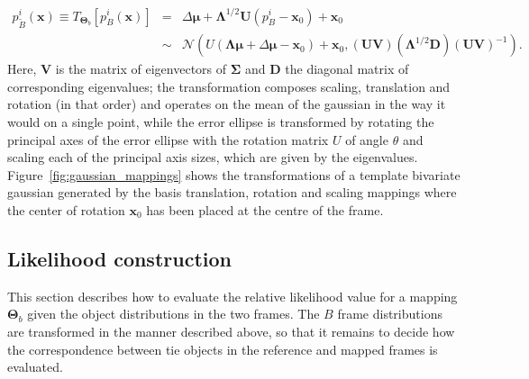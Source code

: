 \documentclass[manuscript]{aastex}
\newcommand{\N}{\mathcal{N}}
\newcommand{\bsmu}{\boldsymbol\mu}
\newcommand{\bsS}{\boldsymbol\Sigma}
\newcommand{\bsL}{\boldsymbol\Lambda}
\newcommand{\bsT}{\boldsymbol\Theta}
\begin{document}
\begin{eqnarray}
 p^i_{\tilde{B}}(\mathbf{x}) \equiv T_{\bsT_b}\left[p^i_{B}(\mathbf{x})\right]& = & \Delta\bsmu + \bsL^{1/2}\mathbf{U}(p^i_B-\mathbf{x}_0) + \mathbf{x}_0 \\ & \sim & \N\left( U(\bsL\bsmu+\Delta\bsmu-\mathbf{x}_0)+\mathbf{x}_0,(\mathbf{U}\mathbf{V})(\bsL^{1/2}\mathbf{D})(\mathbf{U}\mathbf{V})^{-1}\right). \label{eq:bivar_map}
 \end{eqnarray}
Here, $\mathbf{V}$ is the matrix of eigenvectors of $\bsS$ and $\mathbf{D}$ the diagonal matrix of corresponding eigenvalues; the transformation composes scaling, translation and rotation (in that order) and operates on the mean of the gaussian in the way it would on a single point, while the error ellipse is transformed by rotating the principal axes of the error ellipse with the rotation matrix $U$ of angle $\theta$ and scaling each of the principal axis sizes, which are given by the eigenvalues. Figure~\ref{fig:gaussian_mappings} shows the transformations of a template bivariate gaussian generated by the basis translation, rotation and scaling mappings where the center of rotation $\mathbf{x}_0$ has been placed at the centre of the frame.

\subsection{Likelihood construction}
This section describes how to evaluate the relative likelihood value for a mapping $\bsT_b$ given the object distributions in the two frames. The $B$ frame distributions are transformed in the manner described above, so that it remains to decide how the correspondence between tie objects in the reference and mapped frames is evaluated.
\end{document}
